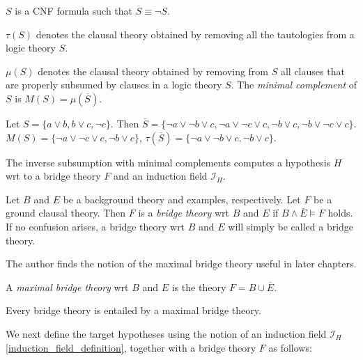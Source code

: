 \begin{remark}
$S$ is a CNF formula such that $\overline{S} \equiv \neg S$.
\end{remark}

\begin{defn}
\emph{$\tau(S)$} denotes the clausal theory obtained by removing all the tautologies from a logic theory $S$.
\end{defn}

\begin{defn}
\emph{$\mu(S)$} denotes the clausal theory obtained by removing from $S$ all clauses that are properly subsumed by clauses in a logic theory $S$.
The \emph{minimal complement} of $S$ is $M(S)=\mu(\overline{S})$.
\end{defn}

\begin{exmp}
Let $S=\{a \lor b, b \lor c, \neg c\}$. Then
$\overline{S}=\{\neg a \lor \neg b \lor c, \neg a \lor \neg c \lor c, \neg b \lor c, \neg b \lor \neg c \lor c\}$.
$M(S)=\{\neg a \lor \neg c \lor c, \neg b \lor c\}$,
$\tau(\overline{S})=\{\neg a \lor \neg b \lor c, \neg b \lor c\}$.
\end{exmp}

The inverse subsumption with minimal complements computes a hypothesis $H$ wrt to a bridge theory $F$ and an induction field $\mathcal{I}_H$.

\begin{defn}\label{definition_bridge_theory}
Let $B$ and $E$ be a background theory and examples, respectively.
Let $F$ be a ground clausal theory. Then $F$ is a \emph{bridge theory} wrt $B$ and $E$ if
$B \land \overline{E} \models F$ holds. If no confusion arises, a bridge theory wrt $B$ and $E$ will simply be called a bridge theory.
\end{defn}

The author finds the notion of the maximal bridge theory useful in later chapters.
\begin{defn}\label{maximal_bridge_theory_definition}
A \emph{maximal bridge theory} wrt $B$ and $E$ is the theory $F = B \cup \overline{E}$.
\end{defn}
\begin{remark}
Every bridge theory is entailed by a maximal bridge theory.
\end{remark}

We next define the target hypotheses using the notion of an induction field $\mathcal{I}_H$\ref{induction_field_definition}, together with a bridge theory $F$ as follows:

